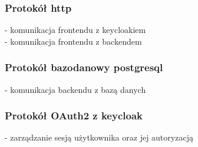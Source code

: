 \documentclass[12pt,a4paper]{article}
\begin{document}
\subsubsection{Protokół http} 
 - komunikacja frontendu z keycloakiem \\
 - komunikacja frontendu z backendem 
 \subsubsection{Protokół bazodanowy postgresql}
 - komunikacja backendu z bazą danych 
  \subsubsection{Protokół OAuth2 z keycloak}
- zarządzanie sesją użytkownika oraz jej autoryzacją
\noindent




\nocite{*}
\end{document}
